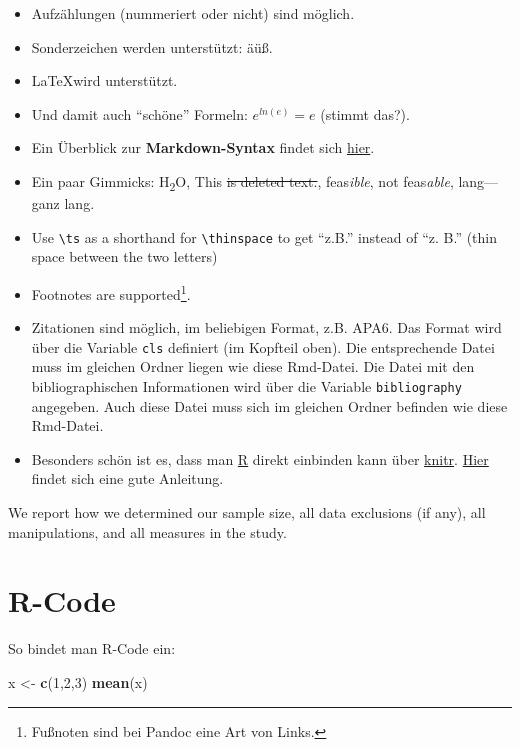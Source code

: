 \documentclass[11pt,english,a4paper,oneside]{article}
\newenvironment{Shaded}{\begin{snugshade}}{\end{snugshade}}
\newcommand{\DecValTok}[1]{\textcolor[rgb]{0.00,0.00,0.81}{#1}}
\newcommand{\KeywordTok}[1]{\textcolor[rgb]{0.13,0.29,0.53}{\textbf{#1}}}
\newcommand{\NormalTok}[1]{#1}
\newcommand{\StringTok}[1]{\textcolor[rgb]{0.31,0.60,0.02}{#1}}
\newcommand{\ts}{\thinspace}
\begin{document}
\begin{itemize}
\item
  Aufzählungen (nummeriert oder nicht) sind möglich.
\item
  Sonderzeichen werden unterstützt: äüß.
\item
  \LaTeX wird unterstützt.
\item
  Und damit auch \enquote{schöne} Formeln: \(e^{ln(e)}=e\) (stimmt
  das?).
\item
  Ein Überblick zur \textbf{Markdown-Syntax} findet sich
  \href{http://pandoc.org/README.html\#pandocs-markdown}{hier}.
\item
  Ein paar Gimmicks: H\textsubscript{2}O, This \sout{is deleted text.},
  feas\emph{ible}, not feas\emph{able}, lang---ganz lang.
\item
  Use \texttt{\textbackslash{}ts} as a shorthand for
  \texttt{\textbackslash{}thinspace} to get \enquote{z.\ts B.} instead
  of \enquote{z. B.} (thin space between the two letters)
\item
  Footnotes are supported\footnote{Fußnoten sind bei Pandoc eine Art von
    Links.}.
\item
  Zitationen sind möglich, im beliebigen Format, z.B. APA6. Das Format
  wird über die Variable \texttt{cls} definiert (im Kopfteil oben). Die
  entsprechende Datei muss im gleichen Ordner liegen wie diese
  Rmd-Datei. Die Datei mit den bibliographischen Informationen wird über
  die Variable \texttt{bibliography} angegeben. Auch diese Datei muss
  sich im gleichen Ordner befinden wie diese Rmd-Datei.
\item
  Besonders schön ist es, dass man \href{https://cran.r-project.org}{R}
  direkt einbinden kann über \href{http://yihui.name/knitr/}{knitr}.
  \href{http://galahad.well.ox.ac.uk/repro/}{Hier} findet sich eine gute
  Anleitung.
\end{itemize}

We report how we determined our sample size, all data exclusions (if
any), all manipulations, and all measures in the study.

\hypertarget{r-code}{%
\section{R-Code}\label{r-code}}

So bindet man R-Code ein:

\begin{Shaded}
\begin{Highlighting}[]
\NormalTok{x <-}\StringTok{ }\KeywordTok{c}\NormalTok{(}\DecValTok{1}\NormalTok{,}\DecValTok{2}\NormalTok{,}\DecValTok{3}\NormalTok{)}
\KeywordTok{mean}\NormalTok{(x)}
\end{Highlighting}
\end{Shaded}
\end{document}
